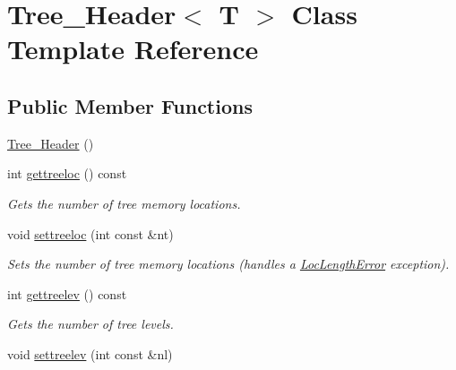 \hypertarget{classTree__Header}{
\section{Tree\_\-Header$<$ T $>$ Class Template Reference}
\label{classTree__Header}
}
\subsection*{Public Member Functions}
\begin{DoxyCompactItemize}
\item 
\hyperlink{classTree__Header_afd804e3208294dabc6f24f597133ec29}{Tree\_\-Header} ()
\item 
\hypertarget{classTree__Header_ac06076ecec5f61bc44066cf5c4008921}{
int \hyperlink{classTree__Header_ac06076ecec5f61bc44066cf5c4008921}{gettreeloc} () const }
\label{classTree__Header_ac06076ecec5f61bc44066cf5c4008921}

\begin{DoxyCompactList}\small\item\em Gets the number of tree memory locations. \item\end{DoxyCompactList}\item 
\hypertarget{classTree__Header_a7bd256dd1c10ba6c8ef064f133695a8b}{
void \hyperlink{classTree__Header_a7bd256dd1c10ba6c8ef064f133695a8b}{settreeloc} (int const \&nt)}
\label{classTree__Header_a7bd256dd1c10ba6c8ef064f133695a8b}

\begin{DoxyCompactList}\small\item\em Sets the number of tree memory locations (handles a \hyperlink{classLocLengthError}{LocLengthError} exception). \item\end{DoxyCompactList}\item 
\hypertarget{classTree__Header_a8fd3e3d0451690385b00417f841f06e4}{
int \hyperlink{classTree__Header_a8fd3e3d0451690385b00417f841f06e4}{gettreelev} () const }
\label{classTree__Header_a8fd3e3d0451690385b00417f841f06e4}

\begin{DoxyCompactList}\small\item\em Gets the number of tree levels. \item\end{DoxyCompactList}\item 
\hypertarget{classTree__Header_a4144fe52a6ddf6f4db7b3084e8d3f881}{
void \hyperlink{classTree__Header_a4144fe52a6ddf6f4db7b3084e8d3f881}{settreelev} (int const \&nl)}
\label{classTree__Header_a4144fe52a6ddf6f4db7b3084e8d3f881}


\end{DoxyCompactItemize}
